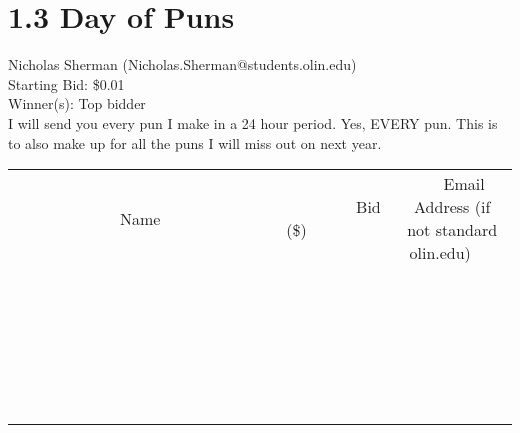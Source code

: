 \documentclass[11pt]{article}
\begin{document}
\section*{1.3 Day of Puns}
Nicholas Sherman (Nicholas.Sherman@students.olin.edu) \\
Starting Bid: \$0.01 \\
Winner(s): 
Top bidder \\
I will send you every pun I make in a 24 hour period. Yes, EVERY pun. This is to also make up for all the puns I will miss out on next year. \\[6ex]
\begin{tabular}{c c c}
~~~~~~~~~~~~~Name~~~~~~~~~~~~~ & ~~~~~~~~~Bid (\$)~~~~~~~~~ & ~~~Email Address (if not standard olin.edu)~~~ \\
 & & \\
\hline
 & & \\
\hline
 & & \\
\hline
 & & \\
\hline
 & & \\
\hline
 & & \\
\hline
 & & \\
\hline
 & & \\
\hline
 & & \\
\hline
 & & \\
\hline
 & & \\
\hline
 & & \\
\hline
 & & \\
\hline
 & & \\
\hline
 & & \\
\hline
 & & \\
\hline
 & & \\
\hline
 & & \\
\hline
 & & \\
\hline
 & & \\
\hline
 & & \\
\hline
 & & \\
\hline
 & & \\
\hline
 & & \\
\hline
 & & \\
\hline
 & & \\
\hline
\end{tabular}
\clearpage
\end{document}
